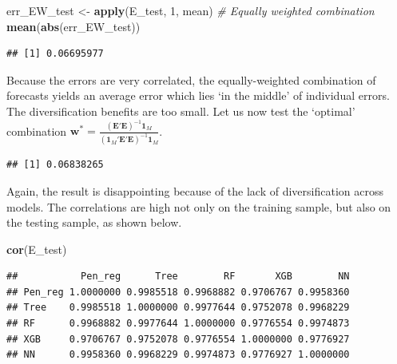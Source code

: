 \documentclass[]{krantz}
\makeatletter
\newenvironment{Shaded}{\begin{snugshade}}{\end{snugshade}}
\newcommand{\CommentTok}[1]{\textcolor[rgb]{0.37,0.37,0.37}{\textit{#1}}}
\newcommand{\DecValTok}[1]{\textcolor[rgb]{0.06,0.06,0.06}{#1}}
\newcommand{\KeywordTok}[1]{\textcolor[rgb]{0.27,0.27,0.27}{\textbf{#1}}}
\newcommand{\NormalTok}[1]{#1}
\newcommand{\OperatorTok}[1]{\textcolor[rgb]{0.43,0.43,0.43}{\textbf{#1}}}
\newcommand{\StringTok}[1]{\textcolor[rgb]{0.5,0.5,0.5}{#1}}
\newenvironment{kframe}{%
\medskip{}
\setlength{\fboxsep}{.8em}
 \def\at@end@of@kframe{}%
 \ifinner\ifhmode%
  \def\at@end@of@kframe{\end{minipage}}%
  \begin{minipage}{\columnwidth}%
 \fi\fi%
 \def\FrameCommand##1{\hskip\@totalleftmargin \hskip-\fboxsep
 \colorbox{shadecolor}{##1}\hskip-\fboxsep
     \hskip-\linewidth \hskip-\@totalleftmargin \hskip\columnwidth}%
 \MakeFramed {\advance\hsize-\width
   \@totalleftmargin\z@ \linewidth\hsize
   \@setminipage}}%
 {\par\unskip\endMakeFramed%
 \at@end@of@kframe}
\renewenvironment{Shaded}{\begin{kframe}}{\end{kframe}}
\theoremstyle{definition}
\theoremstyle{definition}
\theoremstyle{definition}
\theoremstyle{remark}
\makeatother
\begin{document}
\begin{Shaded}
\begin{Highlighting}[]
\NormalTok{err_EW_test <-}\StringTok{ }\KeywordTok{apply}\NormalTok{(E_test, }\DecValTok{1}\NormalTok{, mean)  }\CommentTok{# Equally weighted combination}
\KeywordTok{mean}\NormalTok{(}\KeywordTok{abs}\NormalTok{(err_EW_test))}
\end{Highlighting}
\end{Shaded}

\begin{verbatim}
## [1] 0.06695977
\end{verbatim}

\normalsize

Because the errors are very correlated, the equally-weighted combination
of forecasts yields an average error which lies `in the middle' of
individual errors. The diversification benefits are too small. Let us
now test the `optimal' combination
\(\textbf{w}^*=\frac{(\textbf{E}'\textbf{E})^{-1}\textbf{1}_M}{(\textbf{1}_M'\textbf{E}'\textbf{E})^{-1}\textbf{1}_M}\).

\footnotesize

\begin{Shaded}
\end{Shaded}

\begin{verbatim}
## [1] 0.06838265
\end{verbatim}

\normalsize

Again, the result is disappointing because of the lack of
diversification across models. The correlations are high not only on the
training sample, but also on the testing sample, as shown below.

\footnotesize

\begin{Shaded}
\begin{Highlighting}[]
\KeywordTok{cor}\NormalTok{(E_test)}
\end{Highlighting}
\end{Shaded}

\begin{verbatim}
##           Pen_reg      Tree        RF       XGB        NN
## Pen_reg 1.0000000 0.9985518 0.9968882 0.9706767 0.9958360
## Tree    0.9985518 1.0000000 0.9977644 0.9752078 0.9968229
## RF      0.9968882 0.9977644 1.0000000 0.9776554 0.9974873
## XGB     0.9706767 0.9752078 0.9776554 1.0000000 0.9776927
## NN      0.9958360 0.9968229 0.9974873 0.9776927 1.0000000
\end{verbatim}
\end{document}
